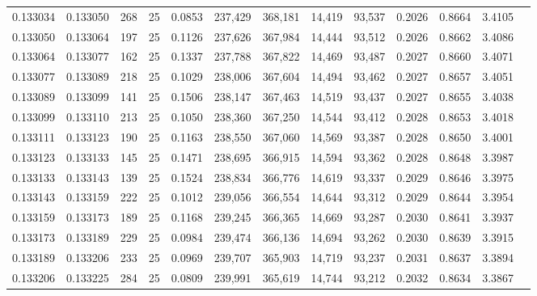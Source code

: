 \begin{tabular}{rrrrrrrrrrrrr}
0.133034 & 0.133050 &   268 &  25 &                                     0.0853 & 237,429 & 368,181 &  14,419 &  93,537 & 0.2026 & 0.8664 & 3.4105 \\
0.133050 & 0.133064 &   197 &  25 &                                     0.1126 & 237,626 & 367,984 &  14,444 &  93,512 & 0.2026 & 0.8662 & 3.4086 \\
0.133064 & 0.133077 &   162 &  25 &                                     0.1337 & 237,788 & 367,822 &  14,469 &  93,487 & 0.2027 & 0.8660 & 3.4071 \\
0.133077 & 0.133089 &   218 &  25 &                                     0.1029 & 238,006 & 367,604 &  14,494 &  93,462 & 0.2027 & 0.8657 & 3.4051 \\
0.133089 & 0.133099 &   141 &  25 &                                     0.1506 & 238,147 & 367,463 &  14,519 &  93,437 & 0.2027 & 0.8655 & 3.4038 \\
0.133099 & 0.133110 &   213 &  25 &                                     0.1050 & 238,360 & 367,250 &  14,544 &  93,412 & 0.2028 & 0.8653 & 3.4018 \\
0.133111 & 0.133123 &   190 &  25 &                                     0.1163 & 238,550 & 367,060 &  14,569 &  93,387 & 0.2028 & 0.8650 & 3.4001 \\
0.133123 & 0.133133 &   145 &  25 &                                     0.1471 & 238,695 & 366,915 &  14,594 &  93,362 & 0.2028 & 0.8648 & 3.3987 \\
0.133133 & 0.133143 &   139 &  25 &                                     0.1524 & 238,834 & 366,776 &  14,619 &  93,337 & 0.2029 & 0.8646 & 3.3975 \\
0.133143 & 0.133159 &   222 &  25 &                                     0.1012 & 239,056 & 366,554 &  14,644 &  93,312 & 0.2029 & 0.8644 & 3.3954 \\
0.133159 & 0.133173 &   189 &  25 &                                     0.1168 & 239,245 & 366,365 &  14,669 &  93,287 & 0.2030 & 0.8641 & 3.3937 \\
0.133173 & 0.133189 &   229 &  25 &                                     0.0984 & 239,474 & 366,136 &  14,694 &  93,262 & 0.2030 & 0.8639 & 3.3915 \\
0.133189 & 0.133206 &   233 &  25 &                                     0.0969 & 239,707 & 365,903 &  14,719 &  93,237 & 0.2031 & 0.8637 & 3.3894 \\
0.133206 & 0.133225 &   284 &  25 &                                     0.0809 & 239,991 & 365,619 &  14,744 &  93,212 & 0.2032 & 0.8634 & 3.3867 \\

\end{tabular}
